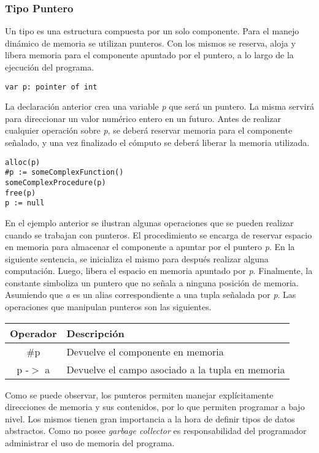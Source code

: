 \documentclass{article}
\begin{document}
\subsubsection{Tipo Puntero}

Un tipo  es una estructura compuesta por un solo componente.
Para el manejo dinámico de memoria se utilizan punteros.
Con los mismos se reserva, aloja y libera memoria para el componente apuntado por el puntero, a lo largo de la ejecución del programa.
\begin{lstlisting}
var p: pointer of int
\end{lstlisting}

La declaración anterior crea una variable \textit{p} que será un puntero.
La misma servirá para direccionar un valor numérico entero en un futuro.
Antes de realizar cualquier operación sobre \textit{p}, se deberá reservar memoria para el componente señalado, y una vez finalizado el cómputo se deberá liberar la memoria utilizada.
\begin{lstlisting}
alloc(p)
#p := someComplexFunction()
someComplexProcedure(p)
free(p)
p := null
\end{lstlisting}

En el ejemplo anterior se ilustran algunas operaciones que se pueden realizar cuando se trabajan con punteros.
El procedimiento  se encarga de reservar espacio en memoria para almacenar el componente a apuntar por el puntero \textit{p}.
En la siguiente sentencia, se inicializa el mismo para después realizar alguna computación.
Luego,  libera el espacio en memoria apuntado por \textit{p}.
Finalmente, la constante  simboliza un puntero que no señala a ninguna posición de memoria.
Asumiendo que \textit{a} es un alias correspondiente a una tupla señalada por \textit{p}.
Las operaciones que manipulan punteros son las siguientes.

\begin{center}
\begin{tabular}{| c | l |}
\hline
     Operador & Descripción  \\
     \hline
     $\#$p    & Devuelve el componente en memoria \\
     p -$>$ a & Devuelve el campo asociado a la tupla en memoria \\
\hline
\end{tabular}
\end{center}

Como se puede observar, los punteros permiten manejar explícitamente direcciones de memoria y sus contenidos, por lo que permiten programar a bajo nivel.
Los mismos tienen gran importancia a la hora de definir tipos de datos abstractos.
Como \Lang\space no posee \textit{garbage collector} es responsabilidad del programador administrar el uso de memoria del programa.
\end{document}
